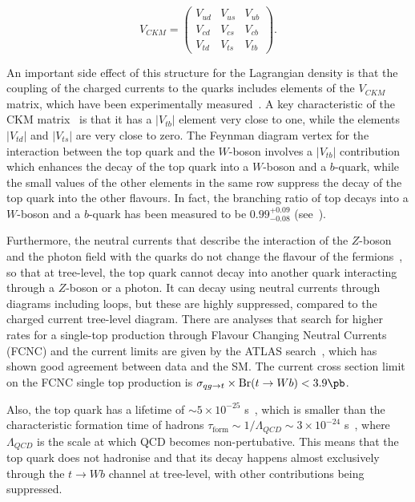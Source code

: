 \begin{equation}
\displaystyle
V_{CKM} = \begin{pmatrix} V_{ud} & V_{us} & V_{ub} \\ V_{cd} & V_{cs} & V_{cb} \\ V_{td} & V_{ts} & V_{tb} \end{pmatrix}.
\label{eq:ckm}
\end{equation}

An important side effect of this structure for the Lagrangian density is that the coupling of the charged currents to the quarks includes elements of the $V_{CKM}$ matrix,
which have been experimentally measured~\cite{pdg2012}.
A key characteristic of the CKM matrix~\cite{pdg2012} is that it has a $|V_{tb}|$ element very close to one, while
the elements $|V_{td}|$ and $|V_{ts}|$ are very close to zero.
The Feynman diagram vertex for the interaction between
the top quark and the $W$-boson involves a $|V_{tb}|$ contribution which enhances the decay of the top quark into a $W$-boson and a $b$-quark, while the small
values of the other elements in the same row suppress the decay of the top quark into the other flavours. In fact, the branching ratio of top
decays into a $W$-boson and a $b$-quark
has been measured to be $0.99 ^{+0.09}_{-0.08}$ (see~\cite{pdg2012}).

Furthermore, the neutral currents that describe the interaction of the $Z$-boson and the photon field with the quarks do not change the flavour
of the fermions~\cite{gim}, so that at tree-level, the top quark cannot decay into another quark interacting through a $Z$-boson or a photon. It can decay using neutral currents
through diagrams including loops, but these are highly suppressed, compared to the charged current tree-level diagram.
There are analyses that search for higher rates for a single-top production through Flavour Changing Neutral Currents (FCNC) and the current limits are given by the
ATLAS search~\cite{fcnc_atlas}, which has shown good agreement between data and the SM. The current cross section limit on the FCNC single top production is
$\sigma_{qg \rightarrow t} \times \textrm{Br}(t \rightarrow Wb) < 3.9 \pb$.

Also, the top quark has a lifetime of $\sim 5 \times 10^{-25}$ s~\cite{topcollider,Incandela:2009pf}, which is smaller than the characteristic formation time
of hadrons $\tau_{\textrm{form}} \sim 1/\Lambda_{QCD} \sim 3 \times 10^{-24}$ s~\cite{Incandela:2009pf}, where $\Lambda_{QCD}$ is the scale at which QCD becomes non-pertubative. This means that the top quark does not hadronise and that its decay happens almost
exclusively through the $t \rightarrow W b$ channel at tree-level, with other contributions being suppressed.

